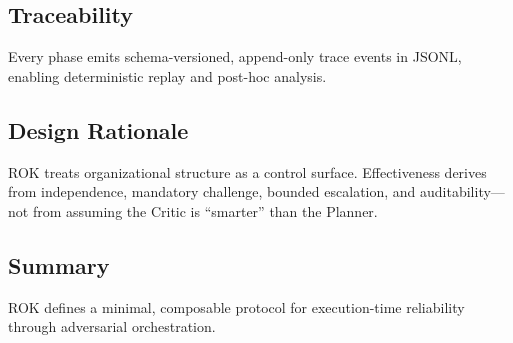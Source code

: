 \subsection{Traceability}
Every phase emits schema-versioned, append-only trace events in JSONL, enabling deterministic replay and post-hoc analysis.

\subsection{Design Rationale}
ROK treats organizational structure as a control surface. Effectiveness derives from independence, mandatory challenge, bounded escalation, and auditability—not from assuming the Critic is “smarter” than the Planner.

\subsection{Summary}
ROK defines a minimal, composable protocol for execution-time reliability through adversarial orchestration.

